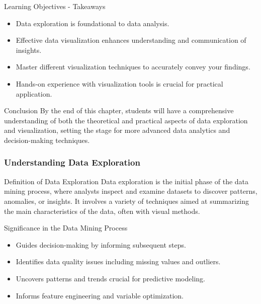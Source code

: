\documentclass[aspectratio=169]{beamer}
\begin{document}
\begin{frame}[fragile]{Learning Objectives - Takeaways}
    \begin{itemize}
        \item Data exploration is foundational to data analysis.
        \item Effective data visualization enhances understanding and communication of insights.
        \item Master different visualization techniques to accurately convey your findings.
        \item Hands-on experience with visualization tools is crucial for practical application.
    \end{itemize}
    
    \begin{block}{Conclusion}
        By the end of this chapter, students will have a comprehensive understanding of both the theoretical and practical aspects of data exploration and visualization, setting the stage for more advanced data analytics and decision-making techniques.
    \end{block}
\end{frame}

\begin{frame}[fragile]
    \frametitle{Understanding Data Exploration}
    \begin{block}{Definition of Data Exploration}
        Data exploration is the initial phase of the data mining process, where analysts inspect and examine datasets to discover patterns, anomalies, or insights. It involves a variety of techniques aimed at summarizing the main characteristics of the data, often with visual methods.
    \end{block}
    
    \begin{block}{Significance in the Data Mining Process}
        \begin{itemize}
            \item Guides decision-making by informing subsequent steps.
            \item Identifies data quality issues including missing values and outliers.
            \item Uncovers patterns and trends crucial for predictive modeling.
            \item Informs feature engineering and variable optimization.
        \end{itemize}
    \end{block}
\end{frame}
\end{document}
